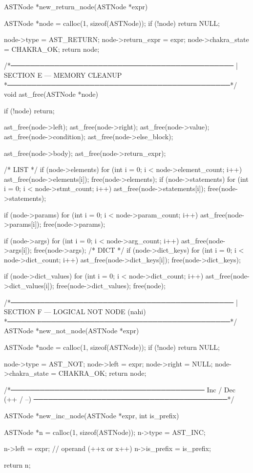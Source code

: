 \documentclass{article}
\begin{document}
ASTNode *new_return_node(ASTNode *expr)
{
    ASTNode *node = calloc(1, sizeof(ASTNode));
    if (!node) return NULL;

    node->type = AST_RETURN;
    node->return_expr = expr;
    node->chakra_state = CHAKRA_OK;
    return node;
}

/*──────────────────────────────────────────────
 | SECTION E — MEMORY CLEANUP
 *──────────────────────────────────────────────*/
void ast_free(ASTNode *node)
{
    if (!node) return;

    ast_free(node->left);
    ast_free(node->right);
    ast_free(node->value);
    ast_free(node->condition);
    ast_free(node->else_block);

    ast_free(node->body);
    ast_free(node->return_expr);

 /* LIST */
    if (node->elements) {
    for (int i = 0; i < node->element_count; i++) {
       ast_free(node->elements[i]);
    }
       free(node->elements);
    }
    if (node->statements) {
        for (int i = 0; i < node->stmt_count; i++)
            ast_free(node->statements[i]);
        free(node->statements);
    }

    if (node->params) {
        for (int i = 0; i < node->param_count; i++)
            ast_free(node->params[i]);
        free(node->params);
    }

    if (node->args) {
        for (int i = 0; i < node->arg_count; i++)
            ast_free(node->args[i]);
        free(node->args);
    }
/* DICT */
    if (node->dict_keys) {
        for (int i = 0; i < node->dict_count; i++) {
            ast_free(node->dict_keys[i]);
        }
        free(node->dict_keys);
    }

    if (node->dict_values) {
        for (int i = 0; i < node->dict_count; i++) {
            ast_free(node->dict_values[i]);
        }
        free(node->dict_values);
    }
    free(node);
}

/*──────────────────────────────────────────────
 | SECTION F — LOGICAL NOT NODE (nahi)
 *──────────────────────────────────────────────*/
ASTNode *new_not_node(ASTNode *expr)
{
    ASTNode *node = calloc(1, sizeof(ASTNode));
    if (!node) return NULL;

    node->type = AST_NOT;
    node->left = expr;
    node->right = NULL;
    node->chakra_state = CHAKRA_OK;
    return node;
}

/*────────────────────────────────────────
  Inc / Dec (++ / --)
────────────────────────────────────────*/

ASTNode *new_inc_node(ASTNode *expr, int is_prefix)
{
    ASTNode *n = calloc(1, sizeof(ASTNode));
    n->type = AST_INC;

    n->left = expr;          // operand (++x or x++)
    n->is_prefix = is_prefix;

    return n;
}
\end{document}
